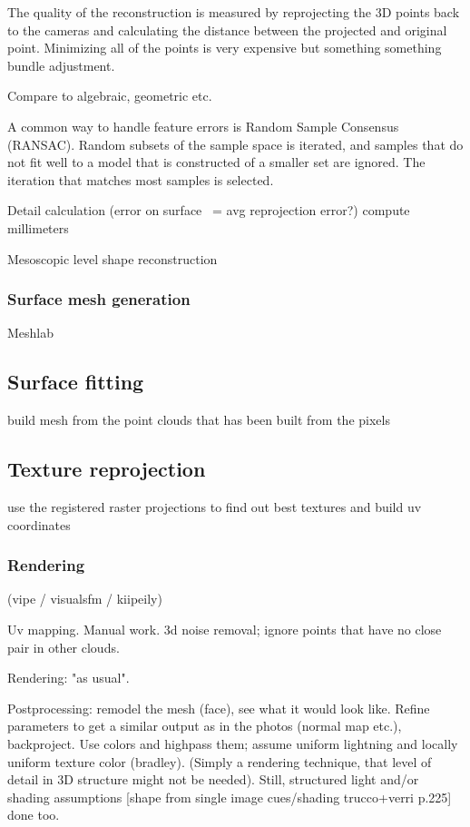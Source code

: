 The quality of the reconstruction is measured by reprojecting the 3D points back to the cameras and calculating the distance between the projected and original point.
Minimizing all of the points is very expensive but something something bundle adjustment.

Compare to algebraic, geometric etc.

A common way to handle feature errors is Random Sample Consensus (RANSAC). Random subsets of the sample space is iterated, and samples that do not fit well to a model that is constructed of a smaller set are ignored. The iteration that matches most samples is selected.

Detail calculation (error on surface ~= avg reprojection error?) compute millimeters

Mesoscopic level shape reconstruction

\subsubsection{Surface mesh generation}

Meshlab

\subsection{Surface fitting}

build mesh from the point clouds that has been built from the pixels

\subsection{Texture reprojection}

use the registered raster projections to find out best textures and build uv coordinates

\subsubsection{Rendering}

(vipe / visualsfm / kiipeily)

Uv mapping. Manual work. 3d noise removal; ignore points that have no close pair in other clouds.

Rendering: "as usual".

Postprocessing: remodel the mesh (face), see what it would look like. Refine parameters to get a similar output as in the photos (normal map etc.), backproject. Use colors and highpass them; assume uniform lightning and locally uniform texture color (bradley). (Simply a rendering technique, that level of detail in 3D structure might not be needed). Still, structured light and/or shading assumptions [shape from single image cues/shading trucco+verri p.225] done too.


